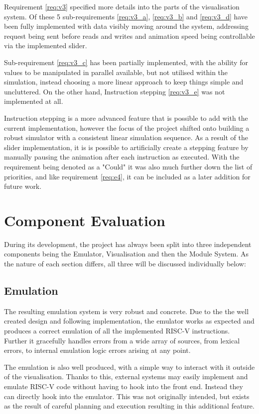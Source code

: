 Requirement \ref{req:v3} specified more details into the parts of the visualisation system. Of these 5 sub-requirements \ref{req:v3_a}, \ref{req:v3_b} and \ref{req:v3_d} have been fully implemented with data visibly moving around the system, addressing request being sent before reads and writes and animation speed being controllable via the implemented slider.

Sub-requirement \ref{req:v3_c} has been partially implemented, with the ability for values to be manipulated in parallel available, but not utilised within the simulation, instead choosing a more linear approach to keep things simple and uncluttered. On the other hand, Instruction stepping \ref{req:v3_e} was not implemented at all. 

Instruction stepping is a more advanced feature that is possible to add with the current implementation, however the focus of the project shifted onto building a robust simulator with a consistent linear simulation sequence. As a result of the slider implementation, it is is possible to artificially create a stepping feature by manually pausing the animation after each instruction as executed. With the requirement being denoted as a "Could" it was also much further down the list of priorities, and like requirement \ref{req:e4}, it can be included as a later addition for future work.

\section{Component Evaluation}
During its development, the project has always been split into three independent components being the Emulator, Visualisation and then the Module System. As the nature of each section differs, all three will be discussed individually below:

\subsection{Emulation}
The resulting emulation system is very robust and concrete. Due to the the well created design and following implementation, the emulator works as expected and produces a correct emulation of all the implemented RISC-V \cite{riscv_2015_riscv} instructions. Further it gracefully handles errors from a wide array of sources, from lexical errors, to internal emulation logic errors arising at any point.

The emulation is also well produced, with a simple way to interact with it outside of the visualisation. Thanks to this, external systems may easily implement and emulate RISC-V code without having to hook into the front end. Instead they can directly hook into the emulator. This was not originally intended, but exists as the result of careful planning and execution resulting in this additional feature.

